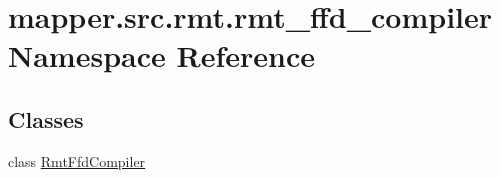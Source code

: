 \hypertarget{namespacemapper_1_1src_1_1rmt_1_1rmt__ffd__compiler}{}\section{mapper.\+src.\+rmt.\+rmt\+\_\+ffd\+\_\+compiler Namespace Reference}
\label{namespacemapper_1_1src_1_1rmt_1_1rmt__ffd__compiler}
\subsection*{Classes}
\begin{DoxyCompactItemize}
\item 
class \hyperlink{classmapper_1_1src_1_1rmt_1_1rmt__ffd__compiler_1_1_rmt_ffd_compiler}{Rmt\+Ffd\+Compiler}
\end{DoxyCompactItemize}
